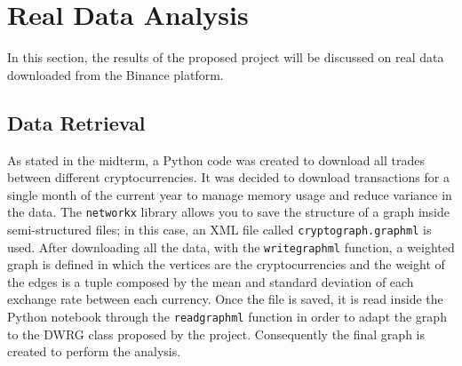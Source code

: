 \section{Real Data Analysis}
In this section, the results of the proposed project will be discussed on real data downloaded from the Binance platform.
\subsection{Data Retrieval}
As stated in the midterm, a Python code was created to download all trades between different cryptocurrencies. It was decided to download transactions for a single month of the current year to manage memory usage and reduce variance in the data.
The \texttt{networkx} library allows you to save the structure of a graph inside semi-structured files; in this case, an XML file called \texttt{crypto\textunderscore graph.graphml} is used. 
After downloading all the data, with the \texttt{write\textunderscore graphml} function, a weighted graph is defined in which the vertices are the cryptocurrencies and the weight of the edges is a tuple composed by the mean and standard deviation of each exchange rate between each currency.
Once the file is saved, it is read inside the Python notebook through the \texttt{read\textunderscore graphml} function in order to adapt the graph to the DWRG class proposed by the project. Consequently the final graph is created to perform the analysis.